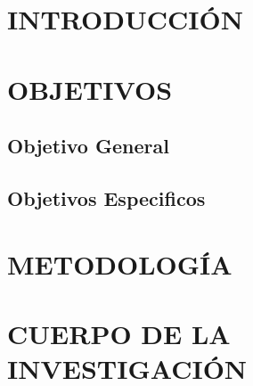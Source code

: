\section*{INTRODUCCIÓN}

\lipsum[1-3]

\section{OBJETIVOS}

    \subsection{Objetivo General}
    \lipsum[1-2]

    \subsection{Objetivos Especificos}
    \lipsum[3-4]

\section{METODOLOGÍA}
\lipsum[7-9]

\section{CUERPO DE LA INVESTIGACIÓN}
\lipsum[13-15]
